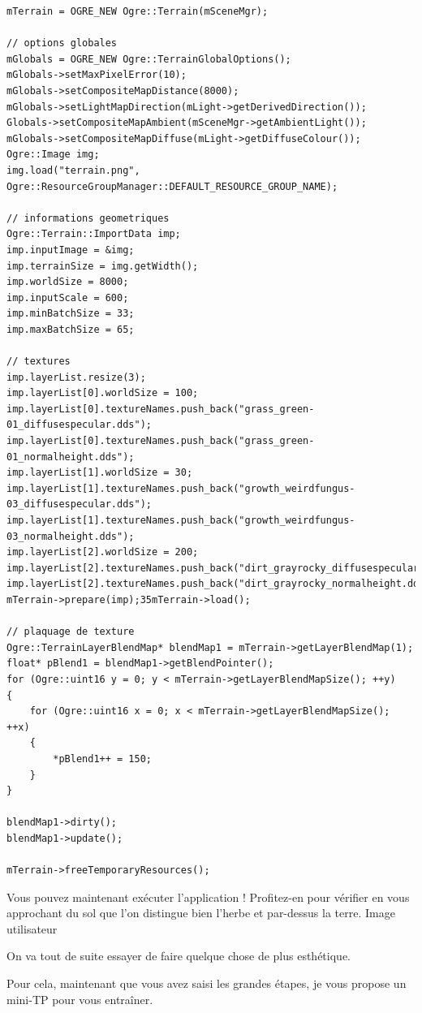 \begin{lstlisting}[caption={createTerrain (code complet)}]
mTerrain = OGRE_NEW Ogre::Terrain(mSceneMgr);

// options globales
mGlobals = OGRE_NEW Ogre::TerrainGlobalOptions();
mGlobals->setMaxPixelError(10);
mGlobals->setCompositeMapDistance(8000);
mGlobals->setLightMapDirection(mLight->getDerivedDirection());
Globals->setCompositeMapAmbient(mSceneMgr->getAmbientLight());
mGlobals->setCompositeMapDiffuse(mLight->getDiffuseColour());
Ogre::Image img;
img.load("terrain.png", Ogre::ResourceGroupManager::DEFAULT_RESOURCE_GROUP_NAME);

// informations geometriques
Ogre::Terrain::ImportData imp;
imp.inputImage = &img;
imp.terrainSize = img.getWidth();
imp.worldSize = 8000;
imp.inputScale = 600;
imp.minBatchSize = 33;
imp.maxBatchSize = 65;

// textures
imp.layerList.resize(3);
imp.layerList[0].worldSize = 100;
imp.layerList[0].textureNames.push_back("grass_green-01_diffusespecular.dds");
imp.layerList[0].textureNames.push_back("grass_green-01_normalheight.dds");
imp.layerList[1].worldSize = 30;
imp.layerList[1].textureNames.push_back("growth_weirdfungus-03_diffusespecular.dds");
imp.layerList[1].textureNames.push_back("growth_weirdfungus-03_normalheight.dds");
imp.layerList[2].worldSize = 200;
imp.layerList[2].textureNames.push_back("dirt_grayrocky_diffusespecular.dds");
imp.layerList[2].textureNames.push_back("dirt_grayrocky_normalheight.dds");
mTerrain->prepare(imp);35mTerrain->load();

// plaquage de texture
Ogre::TerrainLayerBlendMap* blendMap1 = mTerrain->getLayerBlendMap(1);
float* pBlend1 = blendMap1->getBlendPointer();
for (Ogre::uint16 y = 0; y < mTerrain->getLayerBlendMapSize(); ++y)
{
    for (Ogre::uint16 x = 0; x < mTerrain->getLayerBlendMapSize(); ++x)
    {
        *pBlend1++ = 150;
    }
}

blendMap1->dirty();
blendMap1->update();

mTerrain->freeTemporaryResources();
\end{lstlisting}

Vous pouvez maintenant exécuter l'application ! Profitez-en pour vérifier en vous approchant du sol que l'on distingue bien l'herbe et par-dessus la terre.
Image utilisateur

On va tout de suite essayer de faire quelque chose de plus esthétique.

Pour cela, maintenant que vous avez saisi les grandes étapes, je vous propose un mini-TP pour vous entra\^iner.








